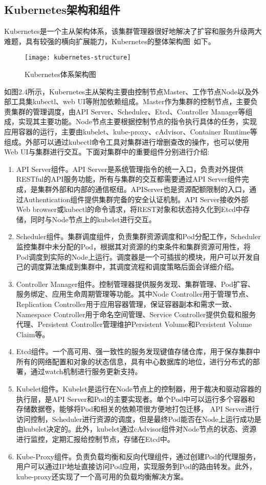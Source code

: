 \subsection{Kubernetes架构和组件}
Kubernetes是一个主从架构体系，该集群管理器很好地解决了扩容和服务升级两大难题，具有较强的横向扩展能力，Kubernetes的整体架构图~\cite{KUBdoc}如下。
\begin{figure}[H] %
	\centering
	\texttt{[image: kubernetes-structure]}
	\caption{Kubernetes体系架构图~\cite{KUBdoc}}
\end{figure}
如图2.4所示，Kubernetes主从架构主要由控制节点Master、工作节点Node以及外部工具集kubectl、web UI等附加依赖组成。Master作为集群的控制节点，主要负责集群的管理调度，由API Server、Scheduler、Etcd、Controller Manager等组成，实现其主要功能。Node节点主要根据控制节点的指令执行具体的任务，实现应用容器的运行，主要由kubelet、kube-proxy、cAdvisor、Container Runtime等组成。外部可以通过kubectl命令工具对集群进行增删查改的操作，也可以使用Web UI与集群进行交互。下面对集群中的重要组件分别进行介绍:
\begin{enumerate}[1.]
	\item  API Server组件。API Server是系统管理指令的统一入口，负责对外提供RESTful的API服务功能，所有与集群的交互都需要通过API Server组件完成，是集群外部和内部的通信枢纽。APIServer也是资源配额限制的入口，通过Authentication组件提供集群完备的安全认证机制。API Server接收外部Web browser或kubectl的命令请求，将REST对象和状态持久化到Etcd中存储，同时与Node节点上的kubelet进行交互。
	\item Scheduler组件。集群调度组件，负责集群资源调度和Pod分配工作，Scheduler监控集群中未分配的Pod，根据其对资源的约束条件和集群资源可用性，将Pod调度到实际的Node上运行。调度器是一个可插拔的模块，用户可以开发自己的调度算法集成到集群中，其调度流程和调度策略后面会详细介绍。
	\item Controller Manager组件。控制管理器提供服务发现、集群管理、Pod扩容、服务绑定、应用生命周期管理等功能。其中Node Controller用于管理节点、Replication Controller用于应用容器管理，保证容器副本和需求一致、Namespace Controller用于命名空间管理、Service Controller提供负载和服务代理、Persistent Controller管理维护Persistent Volume和Persistent Volume Claim等。
	\item Etcd组件。一个高可用、强一致性的服务发现键值存储仓库，用于保存集群中所有的网络配置和对象的状态信息，具有中心数据库的地位，进行分布式的部署，通过watch机制进行服务更新支持。
	\item Kubelet组件。Kubelet是运行在Node节点上的控制器，用于裁决和驱动容器的执行层，是API Server和Pod的主要实现者。单个Pod中可以运行多个容器和存储数据卷，能够将Pod和相关的依赖项很方便地打包迁移，	API Server进行访问控制，Scheduler进行资源的调度，但是最终Pod能否在Node上运行成功是由kubelet决定的。此外，kubelet通过cAdvisor组件对Node节点的状态、资源进行监控，定期汇报给控制节点，存储在Etcd中。
	\item Kube-Proxy组件。负责负载均衡和反向代理组件，通过创建Pod的代理服务，用户可以通过IP地址直接访问Pod应用，实现服务到Pod的路由转发。此外，kube-proxy还实现了一个高可用的负载均衡解决方案。
\end{enumerate}

